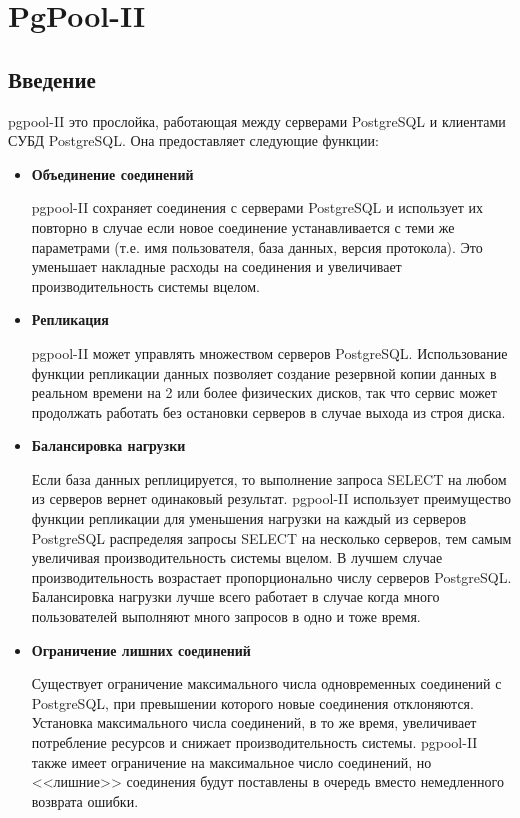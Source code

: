 \chapter{PgPool-II}
\begin{epigraphs}
\end{epigraphs}
\section{Введение}
pgpool-II это прослойка, работающая между серверами PostgreSQL и клиентами СУБД PostgreSQL. 
Она предоставляет следующие функции:
\begin{itemize}
\item \textbf{Объединение соединений} 

pgpool-II сохраняет соединения с серверами PostgreSQL и использует их повторно в случае если новое 
соединение устанавливается с теми же параметрами (т.е. имя пользователя, база данных, версия протокола). 
Это уменьшает накладные расходы на соединения и увеличивает производительность системы вцелом.

\item \textbf{Репликация} 

pgpool-II может управлять множеством серверов PostgreSQL. Использование функции репликации данных позволяет 
создание резервной копии данных в реальном времени на  2 или более физических дисков, так что сервис может 
продолжать работать без остановки серверов в случае выхода из строя диска.

\item \textbf{Балансировка нагрузки}

Если база данных реплицируется, то выполнение запроса SELECT на любом из серверов вернет одинаковый результат. 
pgpool-II использует преимущество функции репликации для уменьшения нагрузки на каждый из серверов PostgreSQL 
распределяя запросы SELECT на несколько серверов, тем самым увеличивая производительность системы вцелом. 
В лучшем случае производительность возрастает пропорционально числу серверов PostgreSQL. Балансировка нагрузки 
лучше всего работает в случае когда много пользователей выполняют много запросов в одно и тоже время.

\item \textbf{Ограничение лишних соединений}

Существует ограничение максимального числа одновременных соединений с PostgreSQL, при превышении которого новые 
соединения отклоняются. Установка максимального числа соединений, в то же время, увеличивает потребление ресурсов и 
снижает производительность системы. pgpool-II также имеет ограничение на максимальное число соединений, но <<лишние>> 
соединения будут поставлены в очередь вместо немедленного возврата ошибки.


\end{itemize}
